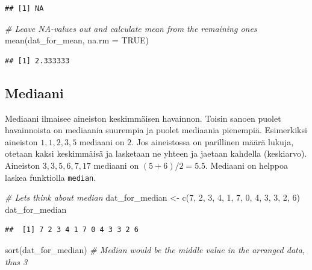 \documentclass[
]{book}
\newenvironment{Shaded}{\begin{snugshade}}{\end{snugshade}}
\newcommand{\AttributeTok}[1]{\textcolor[rgb]{0.77,0.63,0.00}{#1}}
\newcommand{\CommentTok}[1]{\textcolor[rgb]{0.56,0.35,0.01}{\textit{#1}}}
\newcommand{\ConstantTok}[1]{\textcolor[rgb]{0.00,0.00,0.00}{#1}}
\newcommand{\DecValTok}[1]{\textcolor[rgb]{0.00,0.00,0.81}{#1}}
\newcommand{\FunctionTok}[1]{\textcolor[rgb]{0.00,0.00,0.00}{#1}}
\newcommand{\NormalTok}[1]{#1}
\newcommand{\OtherTok}[1]{\textcolor[rgb]{0.56,0.35,0.01}{#1}}
\begin{document}
\begin{verbatim}
## [1] NA
\end{verbatim}

\begin{Shaded}
\begin{Highlighting}[]
\CommentTok{\# Leave NA{-}values out and calculate mean from the remaining ones}
\FunctionTok{mean}\NormalTok{(dat\_for\_mean, }\AttributeTok{na.rm =} \ConstantTok{TRUE}\NormalTok{)}
\end{Highlighting}
\end{Shaded}

\begin{verbatim}
## [1] 2.333333
\end{verbatim}

\hypertarget{mediaani}{%
\subsection{Mediaani}\label{mediaani}}

Mediaani ilmaisee aineiston keskimmäisen havainnon. Toisin sanoen puolet havainnoista on mediaania suurempia ja puolet mediaania pienempiä. Esimerkiksi aineiston \(1, 1, 2, 3, 5\) mediaani on \(2\). Jos aineistossa on parillinen määrä lukuja, otetaan kaksi keskimmäisä ja lasketaan ne yhteen ja jaetaan kahdella (keskiarvo). Aineiston \(3, 3, 5, 6, 7, 17\) mediaani on \((5 + 6) / 2 = 5.5\). Mediaani on helppoa laskea funktiolla \texttt{median}.

\begin{Shaded}
\begin{Highlighting}[]
\CommentTok{\# Let\textquotesingle{}s think about median}
\NormalTok{dat\_for\_median }\OtherTok{\textless{}{-}} \FunctionTok{c}\NormalTok{(}\DecValTok{7}\NormalTok{, }\DecValTok{2}\NormalTok{, }\DecValTok{3}\NormalTok{, }\DecValTok{4}\NormalTok{, }\DecValTok{1}\NormalTok{, }\DecValTok{7}\NormalTok{, }\DecValTok{0}\NormalTok{, }\DecValTok{4}\NormalTok{, }\DecValTok{3}\NormalTok{, }\DecValTok{3}\NormalTok{, }\DecValTok{2}\NormalTok{, }\DecValTok{6}\NormalTok{)}
\NormalTok{dat\_for\_median}
\end{Highlighting}
\end{Shaded}

\begin{verbatim}
##  [1] 7 2 3 4 1 7 0 4 3 3 2 6
\end{verbatim}

\begin{Shaded}
\begin{Highlighting}[]
\FunctionTok{sort}\NormalTok{(dat\_for\_median) }\CommentTok{\# Median would be the middle value in the arranged data, thus 3}
\end{Highlighting}
\end{Shaded}
\end{document}
